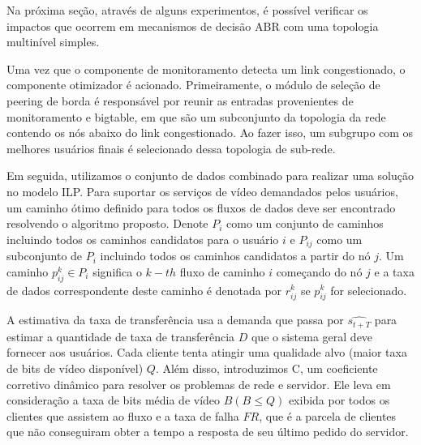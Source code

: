 Na próxima seção, através de alguns experimentos, é possível verificar os impactos que ocorrem em mecanismos de decisão ABR com uma topologia multinível simples.

Uma vez que o componente de monitoramento detecta um link congestionado, o componente otimizador é acionado. Primeiramente, o módulo de seleção de peering de borda é responsável por reunir as entradas provenientes de monitoramento e bigtable, em que são um subconjunto da topologia da rede contendo os nós abaixo do link congestionado. Ao fazer isso, um subgrupo com os melhores usuários finais é selecionado dessa topologia de sub-rede.

Em seguida, utilizamos o conjunto de dados combinado para realizar uma solução no modelo ILP.
Para suportar os serviços de vídeo demandados pelos usuários, um caminho ótimo definido para todos os fluxos de dados deve ser encontrado resolvendo o algoritmo proposto. Denote $P_{i}$ como um conjunto de caminhos incluindo todos os caminhos candidatos para o usuário $i$ e $P_{ij}$ como um subconjunto de $P_{i}$ incluindo todos os caminhos candidatos a partir do nó $j$. Um caminho $p_{ij}^{k} \in P_{i}$ significa o $k-th$ fluxo de caminho $i$ começando do nó $j$ e a taxa de dados correspondente deste caminho é denotada por $r_{ ij}^{k}$ se $p_{ij}^{k}$ for selecionado.



A estimativa da taxa de transferência usa a demanda que passa por $\widehat{s_{t+T}}$ para estimar a quantidade de taxa de transferência $D$ que o sistema geral deve fornecer aos usuários. Cada cliente tenta atingir uma qualidade alvo (maior taxa de bits de vídeo disponível) $Q$.
Além disso, introduzimos C, um coeficiente corretivo dinâmico para resolver os problemas de rede e servidor. Ele leva em consideração a taxa de bits média de vídeo $B (B \leqslant Q)$ exibida por todos os clientes que assistem ao fluxo e a taxa de falha $FR$, que é a parcela de clientes que não conseguiram obter a tempo a resposta de seu último pedido do servidor.


